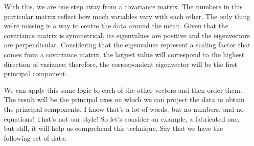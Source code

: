 \documentclass[600paper, 11pt,twoside,openany]{kdp}
\begin{document}
\par 
\vspace{-3pt}
\indent With this, we are one step away from a covariance matrix. The numbers in this particular matrix reflect how much variables vary with each other. The only thing we’re missing is a way to centre the data around the mean. Given that the covariance matrix is symmetrical, its eigenvalues are positive and the eigenvectors are perpendicular. Considering that the eigenvalues represent a scaling factor that comes from a covariance matrix, the largest value will correspond to the highest direction of variance; therefore, the correspondent eigenvector will be the first principal component.
\par 
\vspace{-3pt}
\indent We can apply this same logic to each of the other vectors and then order them. The result will be the principal axes on which we can project the data to obtain the principal components. I know that’s a lot of words, but no numbers, and no equations! That’s not our style! So let’s consider an example, a fabricated one, but still, it will help us comprehend this technique. Say that we have the following set of data:
\begin{center}
\end{center}
\end{document}
